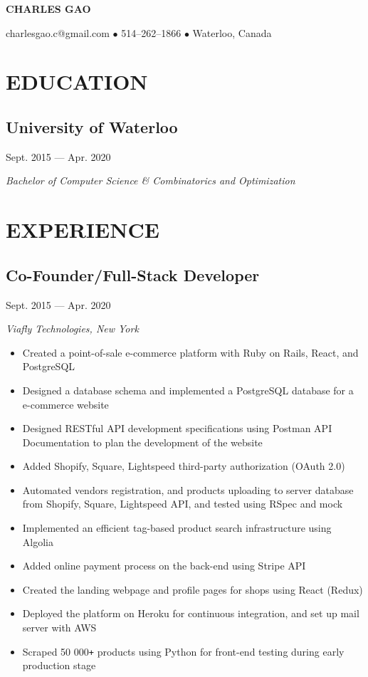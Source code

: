 \documentclass[11pt]{extarticle}
\begin{document}
\begin{center}
\textbf{\huge{CHARLES GAO}}

charlesgao.c@gmail.com $\bullet$ 514--262--1866 $\bullet$ Waterloo, Canada
\end{center}


\section*{EDUCATION}
\subsection*{University of Waterloo} \hfill {Sept. 2015 --- Apr. 2020}

\textit{Bachelor of Computer Science \& Combinatorics and Optimization }

\section*{EXPERIENCE}
\subsection*{Co-Founder/Full-Stack Developer} \hfill {Sept. 2015 --- Apr. 2020}

\textit{Viafly Technologies, New York}
\begin{itemize}
  \item Created a point-of-sale e-commerce platform with Ruby on Rails, React, and PostgreSQL
  \item Designed a database schema and implemented a PostgreSQL database for a e-commerce website
  \item Designed RESTful API development specifications using Postman API Documentation to plan the development of the website
  \item Added Shopify, Square, Lightspeed third-party authorization (OAuth 2.0)
  \item Automated vendors registration, and products uploading to server database from Shopify, Square, Lightspeed API, and tested using RSpec and mock
  \item Implemented an efficient tag-based product search infrastructure using Algolia
  \item Added online payment process on the back-end using Stripe API
  \item Created the landing webpage and profile pages for shops using React (Redux)
  \item Deployed the platform on Heroku for continuous integration, and set up mail server with AWS
  \item Scraped 50 000\texttt{+} products using Python for front-end testing during early production stage
\end{itemize}
\end{document}
